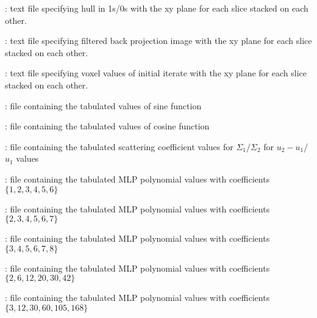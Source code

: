 \documentclass[landscape,12pt]{article}
\begin{document}
\begin{myEnumerate}[labelindent=1pt, leftmargin=*]
\begin{myEnumerate}[labelindent=1pt, leftmargin=*]
\begin{myEnumerate}[labelindent=1pt, leftmargin=*]
\begin{myEnumerate}[labelindent=1pt, leftmargin=*]
\begin{myEnumerate}[labelindent=1pt, leftmargin=*]
\begin{myEnumerate}[labelindent=1pt, leftmargin=*]
\begin{myEnumerate}[labelindent=1pt, leftmargin=*]
\begin{myEnumerate}[labelindent=1pt, leftmargin=*]
\begin{myEnumerate}[labelindent=1pt, leftmargin=*]
                                        \item {} \color{Black}: text file specifying hull in 1s/0s with the xy plane for each slice stacked on each other.
                                        \item {} \color{Black}: text file specifying filtered back projection image with the xy plane for each slice stacked on each other.
                                        \item {} \color{Black}: text file specifying voxel values of initial iterate with the xy plane for each slice stacked on each other.
                                        \item {} \color{Black}: file containing the tabulated values of sine function
                                        \item {} \color{Black}: file containing the tabulated values of cosine function
                                        \item {} \color{Black}: file containing the tabulated scattering coefficient values for $\Sigma_1$/$\Sigma_2$ for $u_2-u_1$/$u_1$ values
                                        \item {} \color{Black}: file containing the tabulated MLP polynomial values with coefficients $\{1,2,3,4,5,6\}$
                                        \item {} \color{Black}: file containing the tabulated MLP polynomial values with coefficients $\{2,3,4,5,6,7\}$
                                        \item {} \color{Black}: file containing the tabulated MLP polynomial values with coefficients $\{3,4,5,6,7,8\}$
                                        \item {} \color{Black}: file containing the tabulated MLP polynomial values with coefficients $\{2,6,12,20,30,42\}$
                                        \item {} \color{Black}: file containing the tabulated MLP polynomial values with coefficients $\{3,12,30,60,105,168\}$

\end{myEnumerate}
\end{myEnumerate}
\end{myEnumerate}
\end{myEnumerate}
\end{myEnumerate}
\end{myEnumerate}
\end{myEnumerate}
\end{myEnumerate}
\end{myEnumerate}
\end{document}
